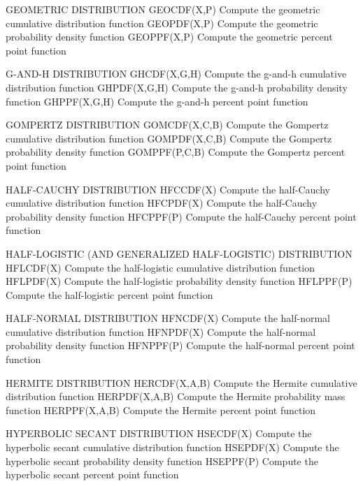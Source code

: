 GEOMETRIC DISTRIBUTION
   GEOCDF(X,P)        Compute the geometric cumulative distribution
                      function
   GEOPDF(X,P)        Compute the geometric probability density
                      function
   GEOPPF(X,P)        Compute the geometric percent point function
 
G-AND-H DISTRIBUTION
   GHCDF(X,G,H)       Compute the g-and-h cumulative distribution
                      function
   GHPDF(X,G,H)       Compute the g-and-h probability density
                      function
   GHPPF(X,G,H)       Compute the g-and-h percent point function
 
GOMPERTZ DISTRIBUTION
   GOMCDF(X,C,B)      Compute the Gompertz cumulative distribution
                      function
   GOMPDF(X,C,B)      Compute the Gompertz probability density
                      function
   GOMPPF(P,C,B)      Compute the Gompertz percent point function
 
HALF-CAUCHY DISTRIBUTION
   HFCCDF(X)          Compute the half-Cauchy cumulative distribution
                      function
   HFCPDF(X)          Compute the half-Cauchy probability density
                      function
   HFCPPF(P)          Compute the half-Cauchy percent point function
 
HALF-LOGISTIC  (AND GENERALIZED HALF-LOGISTIC) DISTRIBUTION
   HFLCDF(X)          Compute the half-logistic cumulative distribution
                      function
   HFLPDF(X)          Compute the half-logistic probability density
                      function
   HFLPPF(P)          Compute the half-logistic percent point function
 
HALF-NORMAL DISTRIBUTION
   HFNCDF(X)          Compute the half-normal cumulative distribution
                      function
   HFNPDF(X)          Compute the half-normal probability density
                      function
   HFNPPF(P)          Compute the half-normal percent point function
 
HERMITE DISTRIBUTION
   HERCDF(X,A,B)      Compute the Hermite cumulative distribution
                      function
   HERPDF(X,A,B)      Compute the Hermite probability mass function
   HERPPF(X,A,B)      Compute the Hermite percent point function

HYPERBOLIC SECANT DISTRIBUTION
   HSECDF(X)          Compute the hyperbolic secant cumulative
                      distribution function
   HSEPDF(X)          Compute the hyperbolic secant probability
                      density function
   HSEPPF(P)          Compute the hyperbolic secant percent point
                      function

